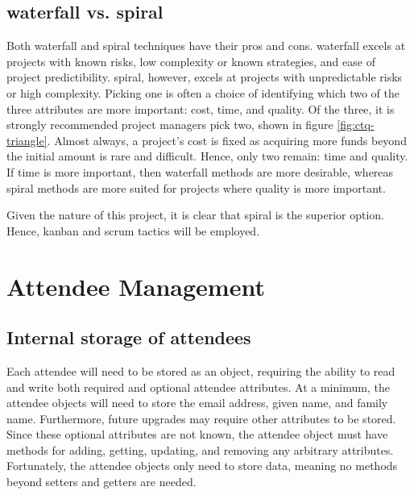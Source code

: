 \documentclass[11pt]{article}
\begin{document}
\subsection{\Gls{waterfall} vs. \Gls{spiral}}

Both \gls{waterfall} and \gls{spiral} techniques have their pros and cons. \Gls{waterfall} excels at projects with known risks, low complexity or known strategies, and ease of project predictibility. \Gls{spiral}, however, excels at projects with unpredictable risks or high complexity. Picking one is often a choice of identifying which two of the three attributes are more important: cost, time, and quality. Of the three, it is strongly recommended project managers pick two, shown in figure \ref{fig:ctq-triangle}. Almost always, a project's cost is fixed as acquiring more funds beyond the initial amount is rare and difficult. Hence, only two remain: time and quality. If time is more important, then \gls{waterfall} methods are more desirable, whereas \gls{spiral} methods are more suited for projects where quality is more important.

Given the nature of this project, it is clear that \gls{spiral} is the superior option. Hence, \Gls{kanban} and \Gls{scrum} tactics will be employed.

\newpage

\section{Attendee Management}

\subsection{Internal storage of attendees}

Each attendee will need to be stored as an \gls{object}, requiring the ability to read and write both required and optional attendee attributes. At a minimum, the attendee \glspl{object} will need to store the email address, given name, and family name. Furthermore, future upgrades may require other attributes to be stored. Since these optional attributes are not known, the attendee \gls{object} must have methods for adding, getting, updating, and removing any arbitrary attributes. Fortunately, the attendee \glspl{object} only need to store data, meaning no methods beyond setters and getters are needed.
\end{document}
